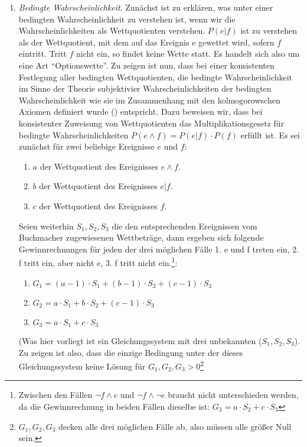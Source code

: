 \begin{enumerate}
  \item {\em Bedingte Wahrscheinlichkeit}. Zunächst ist zu erklären, was unter
  einer bedingten Wahrscheinlichkeit zu verstehen ist, wenn wir die
  Wahrscheinlichkeiten als Wettquotienten verstehen. $P(e|f)$ ist zu verstehen
  als der Wettquotient, mit dem auf das Ereignis e gewettet wird, sofern $f$
  eintritt. Tritt $f$ nicht ein, so findet keine Wette statt. Es handelt sich
  also um eine Art "`Optionswette"'. Zu zeigen ist nun, dass bei
  einer konsistenten Festlegung aller bedingten Wettquotienten, die bedingte
  Wahrscheinlichkeit im Sinne der Theorie subjektivier Wahrscheinlichkeiten der
  bedingten Wahrscheinlichkeit wie sie im Zusammenhang mit den kolmogorowschen
  Axiomen definiert wurde (\pageref{bedingteWahrscheinlichkeit}) entspricht. 
  Dazu beweisen wir, dass bei konsistenter Zuweisung von Wettquotienten das
  Multiplikationsgesetz für bedingte Wahrscheinlichkeiten $P(e \wedge f) =
  P(e|f)\cdot P(f)$ erfüllt ist. Es sei zunächst für zwei beliebige Ereignisse
  $e$ und $f$: 
  \begin{enumerate}
     \item $a$ der Wettquotient des Ereignisses $e \wedge f$.
     \item $b$ der Wettquotient des Ereignisses $e|f$.
     \item $c$ der Wettquotient des Ereignisses $f$.
  \end{enumerate}
  Seien weiterhin $S_1,S_2,S_3$ die den entsprechenden Ereignissen vom
  Buchmacher zugewiesenen Wettbeträge, dann ergeben sich folgende Gewinnrechnungen für
  jeden der drei möglichen Fälle 1. e und f treten ein, 2. f tritt ein, aber
  nicht e, 3. f tritt nicht ein.\footnote{Zwischen den Fällen $\neg f \wedge e$ und
  $\neg f \wedge \neg e$ braucht nicht unterschieden werden, da die
  Gewinnrechnung in beiden Fällen dieselbe ist: $G_3 = a\cdot S_2 + c\cdot
  S_3$}:
  \begin{enumerate}
    \item $G_1 = (a-1)\cdot S_1 + (b-1)\cdot S_2 + (c-1)\cdot S_3$
    \item $G_2 = a\cdot S_1 + b\cdot S_2 + (c-1)\cdot S_3$
    \item $G_3 = a\cdot S_1 + c\cdot S_3$
  \end{enumerate}
  (Was hier vorliegt ist ein Gleichungssystem mit drei unbekannten ($S_1, S_2,
  S_3$). Zu zeigen ist also, dass die einzige Bedingung unter der dieses
  Gleichungssystem keine Lösung für $G_1, G_2, G_3 > 0$\footnote{$G_1, G_2,
  G_3$ decken alle drei möglichen Fälle ab, also müssen alle größer Null sein.
}
\end{enumerate}
